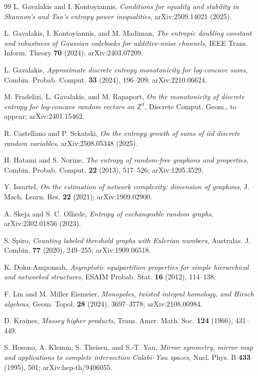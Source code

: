 \documentclass[11pt]{article}
\theoremstyle{definition}
\begin{document}
\begin{thebibliography}{99}
 L. Gavalakis and I. Kontoyiannis, \emph{Conditions for equality and stability in Shannon's and Tao's entropy power inequalities}, arXiv:2509.14021 (2025).

 L. Gavalakis, I. Kontoyiannis, and M. Madiman, \emph{The entropic doubling constant and robustness of Gaussian codebooks for additive-noise channels}, IEEE Trans. Inform. Theory \textbf{70} (2024); arXiv:2403.07209.

 L. Gavalakis, \emph{Approximate discrete entropy monotonicity for log-concave sums}, Combin. Probab. Comput. \textbf{33} (2024), 196--209; arXiv:2210.06624.

 M. Fradelizi, L. Gavalakis, and M. Rapaport, \emph{On the monotonicity of discrete entropy for log-concave random vectors on $\mathbb Z^d$}, Discrete Comput. Geom., to appear; arXiv:2401.15462.

 R. Castellano and P. Sekatski, \emph{On the entropy growth of sums of iid discrete random variables}, arXiv:2508.05348 (2025).

 H. Hatami and S. Norine, \emph{The entropy of random-free graphons and properties}, Combin. Probab. Comput. \textbf{22} (2013), 517--526; arXiv:1205.3529.

 Y. Issartel, \emph{On the estimation of network complexity: dimension of graphons}, J. Mach. Learn. Res. \textbf{22} (2021); arXiv:1909.02900.

 A. Skeja and S. C. Olhede, \emph{Entropy of exchangeable random graphs}, arXiv:2302.01856 (2023).

 S. Spiro, \emph{Counting labeled threshold graphs with Eulerian numbers}, Australas. J. Combin. \textbf{77} (2020), 249--255; arXiv:1909.06518.

 K. Doku-Amponsah, \emph{Asymptotic equipartition properties for simple hierarchical and networked structures}, ESAIM Probab. Stat. \textbf{16} (2012), 114--138.

 F. Lin and M. Miller Eismeier, \emph{Monopoles, twisted integral homology, and Hirsch algebras}, Geom. Topol. \textbf{28} (2024), 3697--3778; arXiv:2108.00984.

 D. Kraines, \emph{Massey higher products}, Trans. Amer. Math. Soc. \textbf{124} (1966), 431--449.

 S. Hosono, A. Klemm, S. Theisen, and S.-T. Yau, \emph{Mirror symmetry, mirror map and applications to complete intersection Calabi--Yau spaces}, Nucl. Phys. B \textbf{433} (1995), 501; arXiv:hep-th/9406055.


\end{thebibliography}
\end{document}
